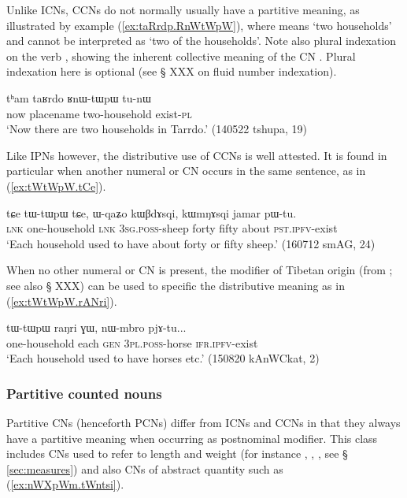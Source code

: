 Unlike ICNs, CCNs do not normally usually have a partitive meaning, as illustrated by example (\ref{ex:taRrdp.RnWtWpW}), where  means `two households' and cannot be interpreted as `two of the households'. Note also plural indexation on the verb , showing the inherent collective meaning of the CN . Plural indexation here is optional (see § XXX on fluid number indexation).

\begin{exe}
\ex \label{ex:taRrdp.RnWtWpW}
\gll tʰam taʁrdo ʁnɯ-tɯpɯ tu-nɯ \\
now placename two-household exist-\textsc{pl} \\
\glt `Now there are two households in Tarrdo.' (140522 tshupa, 19)
\end{exe} 

Like IPNs however, the distributive use of CCNs is well attested. It is found in particular when another numeral or CN occurs in the same sentence, as in (\ref{ex:tWtWpW.tCe}).

\begin{exe}
\ex \label{ex:tWtWpW.tCe}
\gll tɕe tɯ-tɯpɯ tɕe, ɯ-qaʑo kɯβdɤsqi, kɯmŋɤsqi jamar pɯ-tu. \\
\textsc{lnk} one-household \textsc{lnk} \textsc{3sg}.\textsc{poss}-sheep forty fifty about \textsc{pst}.\textsc{ipfv}-exist \\
\glt `Each household used to have about forty or fifty sheep.' (160712 smAG, 24)
\end{exe} 

When no other numeral or CN is present, the modifier of Tibetan origin  (from ; see also § XXX) can be used to specific the distributive meaning as in (\ref{ex:tWtWpW.rANri}).

\begin{exe}
\ex \label{ex:tWtWpW.rANri}
\gll tɯ-tɯpɯ raŋri ɣɯ, nɯ-mbro pjɤ-tu... \\
one-household  each \textsc{gen} \textsc{3pl}.\textsc{poss}-horse \textsc{ifr}.\textsc{ipfv}-exist \\
\glt `Each household used to have horses etc.' (150820 kAnWCkat, 2)
\end{exe} 

\subsubsection{Partitive counted nouns} \label{sec:CN.partitive}
Partitive CNs (henceforth PCNs) differ from ICNs and CCNs in that they always have a partitive meaning when occurring as postnominal modifier. This class includes CNs used to refer to length and weight (for instance , , , see § \ref{sec:measures}) and also CNs of abstract quantity such as  (\ref{ex:nWXpWm.tWntsi}).

